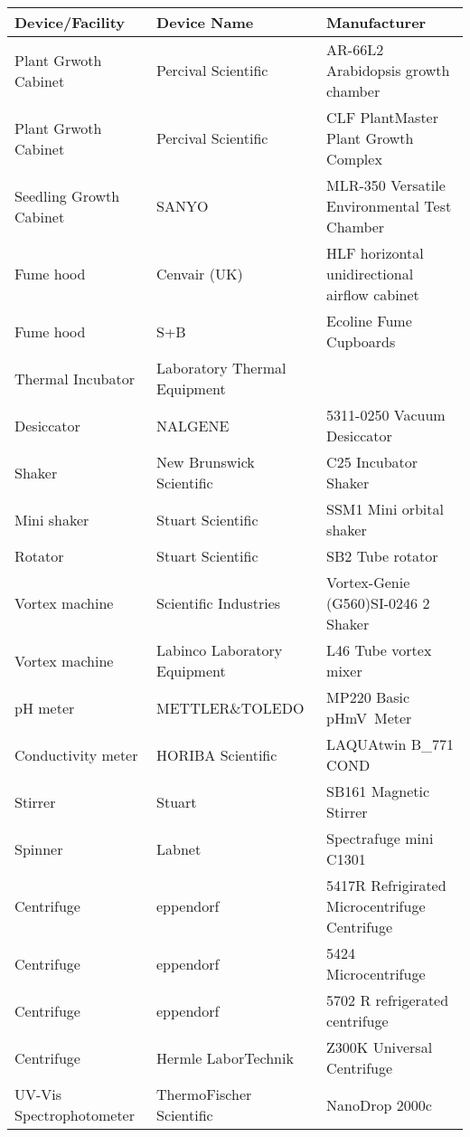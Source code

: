	\begin{longtable}{ |L{3cm}|C{4cm}|C{6.5cm}|}
		\hline
		\textsf{\textbf{Device/Facility}} & \textsf{\textbf{Device Name}} & \textsf{\textbf{Manufacturer}} \\
		\hline
		Plant Grwoth Cabinet & Percival Scientific & AR-66L2 Arabidopsis growth chamber \\
		\hline
		Plant Grwoth Cabinet & Percival Scientific & CLF PlantMaster Plant Growth Complex\\
		\hline
		Seedling Growth Cabinet & SANYO & MLR-350 Versatile Environmental Test Chamber \\
		\hline
		Fume hood & Cenvair (UK) & HLF horizontal unidirectional airflow cabinet \\
		\hline
		Fume hood & S+B & Ecoline Fume Cupboards \\
		\hline
		Thermal Incubator & Laboratory Thermal Equipment & \\
		\hline
		Desiccator & NALGENE & 5311-0250 Vacuum Desiccator \\
		\hline 
		Shaker & New Brunswick Scientific & C25 Incubator Shaker \\
		\hline
		Mini shaker & Stuart Scientific & SSM1 Mini orbital shaker \\
		\hline
		Rotator & Stuart Scientific & SB2 Tube rotator \\
		\hline
		Vortex machine & Scientific Industries & Vortex-Genie (G560)SI-0246 2 Shaker \\
		\hline
		Vortex machine & Labinco Laboratory Equipment & L46 Tube vortex mixer \\
		\hline
		pH meter & METTLER\&TOLEDO & MP220 Basic pH\textfractionsolidus mV\textfractionsolidus \textcelsius ~Meter \\
		\hline
		Conductivity meter & HORIBA Scientific & LAQUAtwin B\_771 COND \\
		\hline
		Stirrer & Stuart & SB161 Magnetic Stirrer \\
		\hline
		Spinner & Labnet & Spectrafuge mini C1301 \\
		\hline
		Centrifuge & eppendorf & 5417R Refrigirated Microcentrifuge Centrifuge \\
		\hline
		Centrifuge & eppendorf & 5424 Microcentrifuge \\
		\hline
		Centrifuge & eppendorf & 5702 R refrigerated centrifuge \\
		\hline
		Centrifuge & Hermle LaborTechnik &  Z300K Universal Centrifuge \\
		\hline
		UV-Vis Spectrophotometer & ThermoFischer Scientific  & NanoDrop 2000c \\

\end{longtable}
